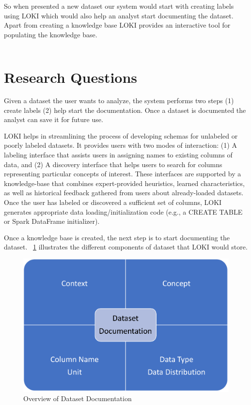 \documentclass{vldb}
\begin{document}
So when presented a new dataset our system would start with creating labels using LOKI which would also help an analyst start documenting the dataset. Apart from creating a knowledge base LOKI provides an interactive tool for populating the knowledge base.\\
\\

\section{Research Questions}
Given a dataset the user wants to analyze, the system performs two steps (1) create labels (2) help start the documentation. Once a dataset is documented the analyst can save it for future use.  

LOKI helps in streamlining the process of developing schemas for unlabeled or poorly labeled datasets. It provides users with two modes of interaction: (1) A labeling interface that assists users in assigning names to existing columns of data, and (2) A discovery interface that helps users to search for columns representing particular concepts of interest. These interfaces are supported by a knowledge-base that combines expert-provided heuristics, learned characteristics, as well as historical feedback gathered from users about already-loaded datasets. Once the user has labeled or discovered a sufficient set of columns, LOKI generates appropriate data loading/initialization code (e.g., a CREATE TABLE or Spark DataFrame initializer).

Once a knowledge base is created, the next step is to start documenting the dataset. ~\ref{fig:DOKI} illustrates the different components of dataset that LOKI would store.

\begin{figure}[h]
	\centering
	\includegraphics[width=0.8\columnwidth]{graphics/DOKI.pdf}
	\caption{Overview of Dataset Documentation}
	\label{fig:DOKI}
	\vspace*{-1mm}
\end{figure}
\end{document}
